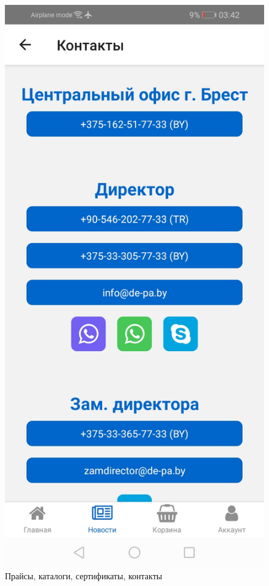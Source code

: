 \begin{figure}[!p]
\begin{minipage}{0.19\textwidth}
        \includegraphics[width=.99\linewidth]
        {images/android/article-contacts.jpg}
    \end{minipage}

    \caption{Прайсы, каталоги, сертификаты, контакты}
    \label{fig:android_articles}
\end{figure}

